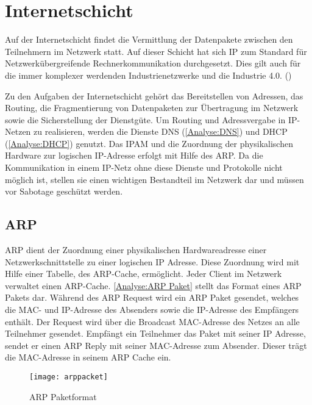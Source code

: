 \section{Internetschicht}
Auf der Internetschicht findet die Vermittlung der Datenpakete zwischen den Teilnehmern im Netzwerk statt. Auf dieser Schicht hat sich \ac{IP} zum Standard für Netzwerkübergreifende Rechnerkommunikation durchgesetzt. Dies gilt auch für die immer komplexer werdenden Industrienetzwerke und die Industrie 4.0. (\cite{meinel2011})

Zu den Aufgaben der Internetschicht gehört das Bereitstellen von Adressen, das Routing, die Fragmentierung von Datenpaketen zur Übertragung im Netzwerk sowie die Sicherstellung der Dienstgüte. Um Routing und Adressvergabe in \ac{IP}-Netzen zu realisieren, werden die Dienste \ac{DNS} (\autoref{Analyse:DNS}) und \ac{DHCP} (\autoref{Analyse:DHCP}) genutzt. Das \ac{IPAM} und die Zuordnung der physikalischen Hardware zur logischen \ac{IP}-Adresse erfolgt mit Hilfe des \ac{ARP}. Da die Kommunikation in einem \ac{IP}-Netz ohne diese Dienste und Protokolle nicht möglich ist, stellen sie einen wichtigen Bestandteil im Netzwerk dar und müssen vor Sabotage geschützt werden.

\subsection{\ac{ARP}}
\label{Analyse:ARP}
\ac{ARP} dient der Zuordnung einer physikalischen Hardwareadresse einer Netzwerkschnittstelle zu einer logischen \ac{IP} Adresse. Diese Zuordnung wird mit Hilfe einer Tabelle, des \ac{ARP}-Cache, ermöglicht. Jeder Client im Netzwerk verwaltet einen \ac{ARP}-Cache. \autoref{Analyse:ARP Paket} stellt das Format eines \ac{ARP} Pakets dar. Während des \ac{ARP} Request wird ein \ac{ARP} Paket gesendet, welches die MAC- und \ac{IP}-Adresse des Absenders sowie die \ac{IP}-Adresse des Empfängers enthält. Der Request wird über die Broadcast MAC-Adresse des Netzes an alle Teilnehmer gesendet. Empfängt ein Teilnehmer das Paket mit seiner \ac{IP} Adresse, sendet er einen \ac{ARP} Reply mit seiner MAC-Adresse zum Absender. Dieser trägt die MAC-Adresse in seinem \ac{ARP} Cache ein.

\begin{figure}[h]
  \centering
  \texttt{[image: arppacket]}
  \caption{ARP Paketformat}
  \label{Analyse:ARP Paket}
\end{figure}

\clearpage

